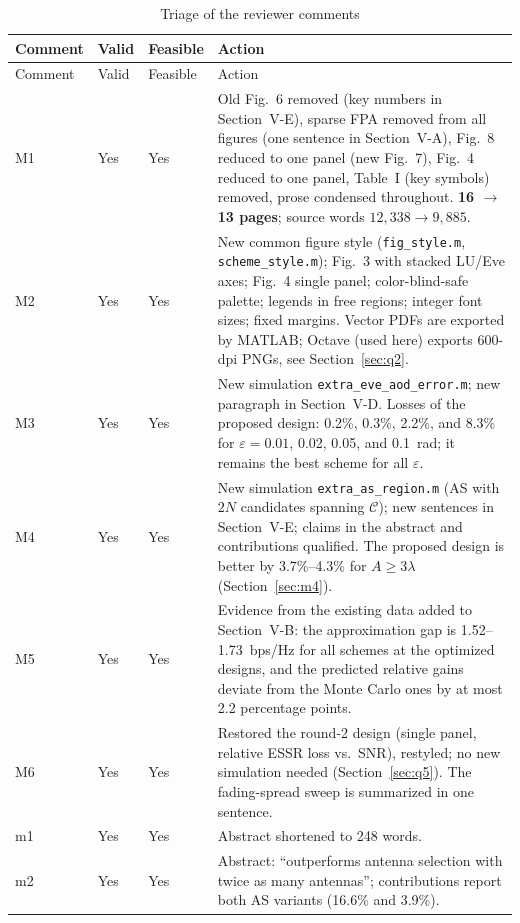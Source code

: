 \documentclass[10pt,a4paper]{article}
\newcommand{\code}[1]{\texttt{#1}}
\newcommand{\yes}{\textcolor{green!45!black}{Yes}}
\begin{document}
{\small
\begin{longtable}{p{1.3cm}p{0.9cm}p{1.3cm}p{11.2cm}}
\caption{Triage of the reviewer comments}\label{tab:triage}\\
\toprule
Comment & Valid & Feasible & Action \\ \midrule
\endfirsthead
\toprule
Comment & Valid & Feasible & Action \\ \midrule
\endhead
M1 & \yes & \yes & Old Fig.~6 removed (key numbers in Section~V-E), sparse FPA removed from all figures (one sentence in Section~V-A), Fig.~8 reduced to one panel (new Fig.~7), Fig.~4 reduced to one panel, Table~I (key symbols) removed, prose condensed throughout. \textbf{16 $\to$ 13 pages}; source words $12{,}338\to9{,}885$. \\
M2 & \yes & \yes & New common figure style (\code{fig\_style.m}, \code{scheme\_style.m}); Fig.~3 with stacked LU/Eve axes; Fig.~4 single panel; color-blind-safe palette; legends in free regions; integer font sizes; fixed margins. Vector PDFs are exported by MATLAB; Octave (used here) exports 600-dpi PNGs, see Section~\ref{sec:q2}. \\
M3 & \yes & \yes & New simulation \code{extra\_eve\_aod\_error.m}; new paragraph in Section~V-D. Losses of the proposed design: 0.2\%, 0.3\%, 2.2\%, and 8.3\% for $\varepsilon=0.01$, 0.02, 0.05, and 0.1~rad; it remains the best scheme for all $\varepsilon$. \\
M4 & \yes & \yes & New simulation \code{extra\_as\_region.m} (AS with $2N$ candidates spanning $\mathcal C$); new sentences in Section~V-E; claims in the abstract and contributions qualified. The proposed design is better by 3.7\%--4.3\% for $A\ge3\lambda$ (Section~\ref{sec:m4}). \\
M5 & \yes & \yes & Evidence from the existing data added to Section~V-B: the approximation gap is 1.52--1.73~bps/Hz for all schemes at the optimized designs, and the predicted relative gains deviate from the Monte Carlo ones by at most 2.2 percentage points. \\
M6 & \yes & \yes & Restored the round-2 design (single panel, relative ESSR loss vs.\ SNR), restyled; no new simulation needed (Section~\ref{sec:q5}). The fading-spread sweep is summarized in one sentence. \\
m1 & \yes & \yes & Abstract shortened to 248 words. \\
m2 & \yes & \yes & Abstract: ``outperforms antenna selection with twice as many antennas''; contributions report both AS variants (16.6\% and 3.9\%). \\

\end{longtable}}
\end{document}
